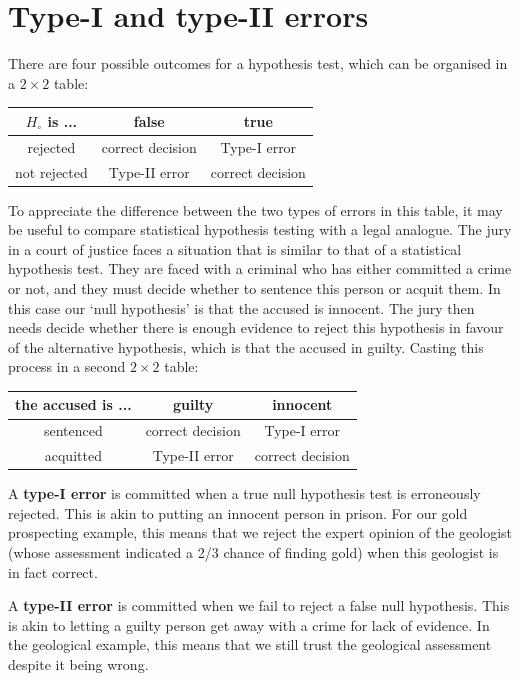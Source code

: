 \section{Type-I and type-II errors}
\label{sec:typeI&II}

There are four possible outcomes for a hypothesis test, which can be
organised in a ${2}\times{2}$ table:

\begin{center}
\begin{tabular}{c|cc}
  $H_\circ$ is ... & false & true \\ \hline
  rejected & correct decision & Type-I error \\
  not rejected & Type-II error & correct decision
\end{tabular}
\end{center}

To appreciate the difference between the two types of errors in this
table, it may be useful to compare statistical hypothesis testing with
a legal analogue. The jury in a court of justice faces a situation
that is similar to that of a statistical hypothesis test. They are
faced with a criminal who has either committed a crime or not, and
they must decide whether to sentence this person or acquit them.  In
this case our `null hypothesis' is that the accused is innocent.  The
jury then needs decide whether there is enough evidence to reject this
hypothesis in favour of the alternative hypothesis, which is that the
accused in guilty. Casting this process in a second ${2}\times{2}$
table:

\begin{center}
\begin{tabular}{c|cc}
  the accused is ... & guilty & innocent \\ \hline
  sentenced & correct decision & Type-I error \\
  acquitted & Type-II error & correct decision
\end{tabular}
\end{center}

A \textbf{type-I error} is committed when a true null hypothesis test
is erroneously rejected. This is akin to putting an innocent person in
prison. For our gold prospecting example, this means that we reject
the expert opinion of the geologist (whose assessment indicated a 2/3
chance of finding gold) when this geologist is in fact
correct.\medskip

A \textbf{type-II error} is committed when we fail to reject a false
null hypothesis.  This is akin to letting a guilty person get away
with a crime for lack of evidence. In the geological example, this
means that we still trust the geological assessment despite it being
wrong.\medskip

